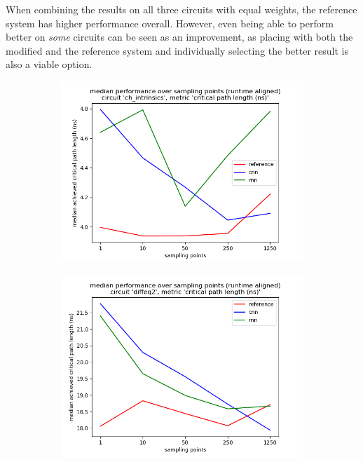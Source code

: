 When combining the results on all three circuits with equal weights, the reference system has higher performance overall. However, even being able to perform better on \textit{some} circuits can be seen as an improvement, as placing with both the modified and the reference system and individually selecting the better result is also a viable option.

\begin{figure}
	\centering
	\begin{subfigure}[b]{0.49\linewidth}
		\includegraphics[width=\linewidth]{plots/eval-ch_intrinsics-critical-path-median-full.png}
	\end{subfigure}
	\begin{subfigure}[b]{0.49\linewidth}
		\includegraphics[width=\linewidth]{plots/eval-diffeq2-critical-path-median-full.png}

\end{subfigure}
\end{figure}
